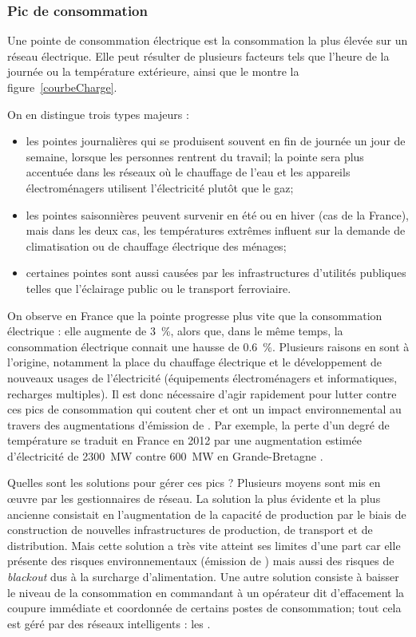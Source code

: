 	\subsubsection{Pic de consommation}
	Une pointe de consommation électrique est la consommation la plus élevée sur un réseau électrique. Elle peut résulter de plusieurs facteurs tels que l'heure de la journée ou la température extérieure, ainsi que le montre la figure~\vref{courbeCharge}.
	
	On en distingue trois types majeurs :
	\begin{itemize}
		\item les pointes journalières qui se produisent souvent en fin de journée un jour de semaine, lorsque les personnes rentrent du travail; la pointe sera plus accentuée dans les réseaux où le chauffage de l'eau et les appareils électroménagers utilisent l'électricité plutôt que le gaz;
		\item les pointes saisonnières peuvent survenir en été ou en hiver (cas de la France), mais dans les deux cas, les températures extrêmes influent sur la demande de climatisation ou de chauffage électrique des ménages;
		\item certaines pointes sont aussi causées par les infrastructures d'utilités publiques telles que l'éclairage public ou le transport ferroviaire.
	\end{itemize}

\bigskip

On observe en France que la pointe progresse plus vite que la consommation électrique : elle augmente de \SI{3}{\percent}, alors que, dans le même temps, la consommation électrique connait une hausse de \SI{0.6}{\percent}. Plusieurs raisons en sont à l'origine, notamment la place du chauffage électrique et le développement de nouveaux usages de l'électricité (équipements électroménagers et informatiques, recharges multiples). Il est donc nécessaire d'agir rapidement pour lutter contre ces pics de consommation qui coutent cher et ont un impact environnemental au travers des augmentations d'émission de .
Par exemple, la perte d'un degré de température se traduit en France en 2012 par une augmentation estimée d'électricité de \SI{2300}{\mega\watt} contre \SI{600}{\mega\watt} en Grande-Bretagne \cite{picFrance}.

Quelles sont les solutions pour gérer ces pics ? Plusieurs moyens sont mis en \oe{}uvre par les gestionnaires de réseau.
La solution la plus évidente et la plus ancienne consistait en l'augmentation de la capacité de production par le biais de construction de nouvelles infrastructures de production, de transport et de distribution. Mais cette solution a très vite atteint ses limites d'une part car elle présente des risques environnementaux (émission de ) mais aussi des risques de \emph{blackout} dus à la surcharge d'alimentation.
Une autre solution consiste à baisser le niveau de la consommation en commandant à un opérateur dit \og{}d'effacement\fg{} la coupure immédiate et coordonnée de certains postes de consommation; tout cela est géré par des réseaux intelligents : les \smartgrids{}.

